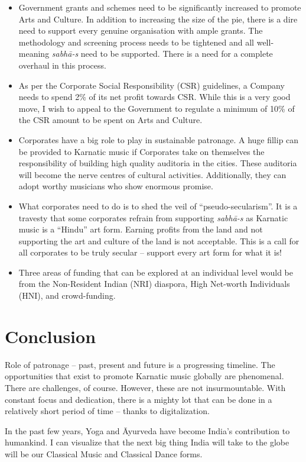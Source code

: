 \begin{itemize}
 \item Government grants and schemes need to be significantly increased to promote Arts and Culture. In addition to increasing the size of the pie, there is a dire need to support every genuine organisation with ample grants. The methodology and screening process needs to be tightened and all well-meaning \textit{sabhā-s} need to be supported. There is a need for a complete overhaul in this process.

 \item As per the Corporate Social Responsibility (CSR) guidelines, a Company needs to spend 2\% of its net profit towards CSR. While this is a very good move, I wish to appeal to the Government to regulate a minimum of 10\% of the CSR amount to be spent on Arts and Culture.

 \item Corporates have a big role to play in sustainable patronage. A huge fillip can be provided to Karnatic music if Corporates take on themselves the responsibility of building high quality auditoria in the cities. These auditoria will become the nerve centres of cultural activities. Additionally, they can adopt worthy musicians who show enormous promise.

 \item What corporates need to do is to shed the veil of “pseudo-secularism”. It is a travesty that some corporates refrain from supporting \textit{sabhā-s} as Karnatic music is a “Hindu” art form. Earning profits from the land and not supporting the art and culture of the land is not acceptable. This is a call for all corporates to be truly secular – support every art form for what it is!

 \item Three areas of funding that can be explored at an individual level would be from the Non-Resident Indian (NRI) diaspora, High Net-worth Individuals (HNI), and crowd-funding.

\end{itemize}

\vspace{-.5cm}

\section*{Conclusion}

Role of patronage – past, present and future is a progressing timeline. The opportunities that exist to promote Karnatic music globally are phenomenal. There are challenges, of course. However, these are not insurmountable. With constant focus and dedication, there is a mighty lot that can be done in a relatively short period of time – thanks to digitalization.

In the past few years, Yoga and Āyurveda have become India’s contribution to humankind. I can visualize that the next big thing India will take to the globe will be our Classical Music and Classical Dance forms.

\theendnotes


